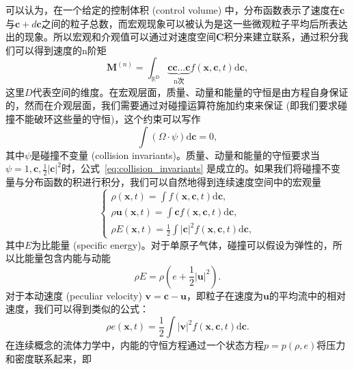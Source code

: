 可以认为，在一个给定的控制体积 (control volume) 中，分布函数表示了速度在$\mathbf{c}$与$\mathbf{c}+d\mathbf{c}$之间的粒子总数，而宏观现象可以被认为是这一些微观粒子平均后所表达出的现象。所以宏观和介观值可以通过对速度空间$\mathbf{C}$积分来建立联系，通过积分我们可以得到速度的n阶矩
\begin{equation}
    \boldsymbol{M}^{(n)}=\int_{\mathbb{R}^{\mathrm{D}}} \underbrace{\mathbf{c} \mathbf{c} \ldots \mathbf{c}}_{\mathrm{n} \text {次}} f(\boldsymbol{x}, \mathbf{c}, t) \mathrm{d} \mathbf{c},
\end{equation}
这里$D$代表空间的维度。在宏观层面，质量、动量和能量的守恒是由方程自身保证的，然而在介观层面，我们需要通过对碰撞运算符施加约束来保证 (即我们要求碰撞不能破环这些量的守恒)，这个约束可以写作
\begin{equation}
    \int\left(\Omega \cdot \psi\right) \mathrm{d} \mathbf{c}=0,
    \label{eq:collision_invariants}
\end{equation}
其中$\psi$是碰撞不变量 (collision invariants)。质量、动量和能量的守恒要求当$\psi=1, \mathbf{c}, \frac{1}{2}|\mathbf{c}|^2$时，公式~\ref{eq:collision_invariants} 是成立的。如果我们将碰撞不变量与分布函数的积进行积分，我们可以自然地得到连续速度空间中的宏观量
\begin{equation}
    \left\{
        \begin{array}
        {l}\rho(\boldsymbol{x}, t)=\int f(\boldsymbol{x}, \mathbf{c}, t) \mathrm{d} \mathbf{c} , \\
        \rho \boldsymbol{u}(\boldsymbol{x}, t)=\int \mathbf{c} f(\boldsymbol{x}, \mathbf{c}, t) \mathrm{d} \mathbf{c} , \\
        \rho E(\boldsymbol{x}, t)=\frac{1}{2} \int|\mathbf{c}|^2 f(\boldsymbol{x}, \mathbf{c}, t) \mathrm{d} \mathbf{c} ,
        \end{array}
    \right.
\end{equation}
其中$E$为比能量 (specific energy)。对于单原子气体，碰撞可以假设为弹性的，所以比能量包含内能与动能
\begin{equation}
    \rho E=\rho\left(e+\frac{1}{2}|\boldsymbol{u}|^2\right).
\end{equation}
对于本动速度 (peculiar velocity) $\boldsymbol{v}=\mathbf{c}-\boldsymbol{u}$，即粒子在速度为$\boldsymbol{u}$的平均流中的相对速度，我们可以得到类似的公式：
\begin{equation}
    \rho e(\boldsymbol{x}, t)=\frac{1}{2} \int|\boldsymbol{v}|^2 f(\boldsymbol{x}, \mathbf{c}, t) \mathrm{d} \mathbf{c}.
\end{equation}
在连续概念的流体力学中，内能的守恒方程通过一个状态方程$p=p(\rho,e)$将压力和密度联系起来，即
